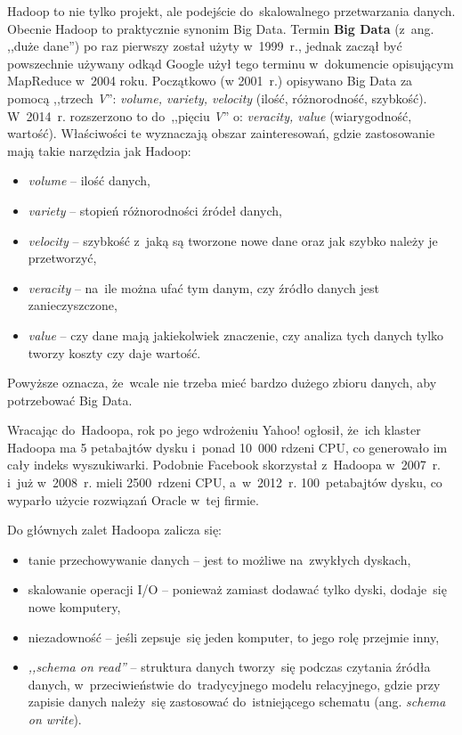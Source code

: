\documentclass[12pt,a4paper,twoside,titlepage,openright]{book}
\begin{document}
Hadoop to nie tylko projekt, ale podejście do~skalowalnego przetwarzania danych. \cite{hadoop} Obecnie Hadoop to praktycznie synonim Big Data. \cite{bigData} Termin \textbf{Big Data} (z~ang. ,,duże dane'') po raz pierwszy został użyty w~1999~r., jednak zaczął być powszechnie używany odkąd Google użył tego terminu w~dokumencie opisującym MapReduce w~2004 roku. Początkowo (w 2001~r.) opisywano Big Data za pomocą ,,trzech \textit{V}'': \textit{volume, variety, velocity} (ilość, różnorodność, szybkość). W~2014~r. rozszerzono to do~,,pięciu \textit{V}'' o: \textit{veracity, value} (wiarygodność, wartość).\cite{realTimeProcessing} Właściwości te wyznaczają obszar zainteresowań, gdzie zastosowanie mają takie narzędzia jak Hadoop:
\begin{itemize}
\item \textit{volume} -- ilość danych,
\item \textit{variety} -- stopień różnorodności źródeł danych,
\item \textit{velocity} -- szybkość z~jaką są tworzone nowe dane oraz jak szybko należy je przetworzyć,
\item \textit{veracity} -- na~ile można ufać tym danym, czy źródło danych jest zanieczyszczone,
\item \textit{value} -- czy dane mają jakiekolwiek znaczenie, czy analiza tych danych tylko tworzy koszty czy daje wartość.
\end{itemize}
Powyższe oznacza, że~wcale nie trzeba mieć bardzo dużego zbioru danych, aby potrzebować Big Data. \cite{hadoop}

Wracając do~Hadoopa, rok po jego wdrożeniu Yahoo! ogłosił, że~ich klaster Hadoopa ma 5 petabajtów dysku i~ponad 10~000 rdzeni CPU, co generowało im cały indeks wyszukiwarki. Podobnie Facebook skorzystał z~Hadoopa w~2007~r. i~już w~2008~r. mieli 2500~rdzeni CPU, a~w~2012~r. 100~petabajtów dysku, co wyparło użycie rozwiązań Oracle w~tej firmie.

Do głównych zalet Hadoopa zalicza się:
\begin{itemize}
\item tanie przechowywanie danych -- jest to możliwe na~zwykłych dyskach,
\item skalowanie operacji I/O -- ponieważ zamiast dodawać tylko dyski, dodaje~się nowe komputery,
\item niezadowność -- jeśli zepsuje~się jeden komputer, to jego rolę przejmie inny,
\item \textit{,,schema on read''} -- struktura danych tworzy~się podczas czytania źródła danych, w~przeciwieństwie do~tradycyjnego modelu relacyjnego, gdzie przy zapisie danych należy~się zastosować do~istniejącego schematu (ang. \textit{schema on write}).
\end{itemize}
\end{document}

